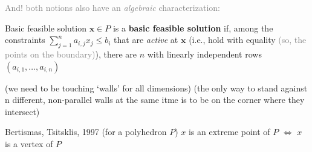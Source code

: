 \documentclass[a4paper, 11pt]{report}
\begin{document}
\vspace{1em}

\begin{center}
    \begin{minipage}{0.9\textwidth}
        \large\noindent
        \textcolor{gray}{And! both notions also have an \textit{algebraic} characterization:}

        \begin{defframe}{Basic feasible solution}{}
        $\boldsymbol{x} \in P$ is a \textbf{basic feasible solution} if, among the constraints $\sum_{j=1}^n a_{i,j} x_j \le b_i$ that are \textit{active} at $\boldsymbol{x}$ (i.e., hold with equality \textcolor{gray}{(so, the points on the boundary)}), there are $n$ with linearly independent rows $(a_{i,1}, \dots, a_{i,n})$ 
        \end{defframe}

        \small(we need to be touching `walls' for all dimensions) (the only way to stand against n different, non-parallel walls at the same itme is to be on the corner where they intersect)
    \end{minipage}
\end{center}

\begin{thmframe}{Bertismas, Tsitsklis, 1997}{}
    (for a polyhedron $P$) $x$ is an extreme point of $P$ $\iff $ $x$ is a vertex of $P$
\end{thmframe}
\end{document}
